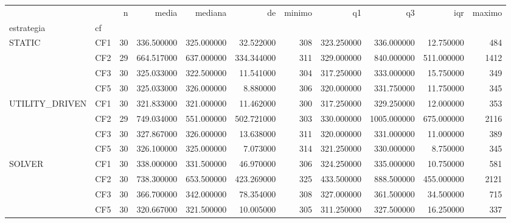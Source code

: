 \begin{tabular}{llrrrrrrrrr}
\toprule
 &  & n & media & mediana & de & minimo & q1 & q3 & iqr & maximo \\
estrategia & cf &  &  &  &  &  &  &  &  &  \\
\midrule
\multirow[t]{4}{*}{STATIC} & CF1 & 30 & 336.500000 & 325.000000 & 32.522000 & 308 & 323.250000 & 336.000000 & 12.750000 & 484 \\
 & CF2 & 29 & 664.517000 & 637.000000 & 334.344000 & 311 & 329.000000 & 840.000000 & 511.000000 & 1412 \\
 & CF3 & 30 & 325.033000 & 322.500000 & 11.541000 & 304 & 317.250000 & 333.000000 & 15.750000 & 349 \\
 & CF5 & 30 & 325.033000 & 326.000000 & 8.880000 & 306 & 320.000000 & 331.750000 & 11.750000 & 345 \\
\cline{1-11}
\multirow[t]{4}{*}{UTILITY_DRIVEN} & CF1 & 30 & 321.833000 & 321.000000 & 11.462000 & 300 & 317.250000 & 329.250000 & 12.000000 & 353 \\
 & CF2 & 29 & 749.034000 & 551.000000 & 502.721000 & 303 & 330.000000 & 1005.000000 & 675.000000 & 2116 \\
 & CF3 & 30 & 327.867000 & 326.000000 & 13.638000 & 311 & 320.000000 & 331.000000 & 11.000000 & 389 \\
 & CF5 & 30 & 326.100000 & 325.000000 & 7.073000 & 314 & 321.250000 & 330.000000 & 8.750000 & 345 \\
\cline{1-11}
\multirow[t]{4}{*}{SOLVER} & CF1 & 30 & 338.000000 & 331.500000 & 46.970000 & 306 & 324.250000 & 335.000000 & 10.750000 & 581 \\
 & CF2 & 30 & 738.300000 & 653.500000 & 423.269000 & 325 & 433.500000 & 888.500000 & 455.000000 & 2121 \\
 & CF3 & 30 & 366.700000 & 342.000000 & 78.354000 & 308 & 327.000000 & 361.500000 & 34.500000 & 715 \\
 & CF5 & 30 & 320.667000 & 321.500000 & 10.005000 & 305 & 311.250000 & 327.500000 & 16.250000 & 337 \\
\cline{1-11}
\bottomrule
\end{tabular}
